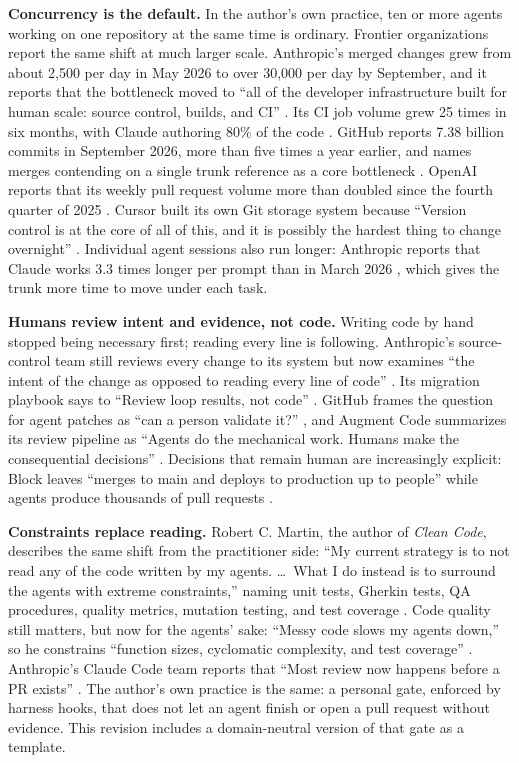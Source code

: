 \documentclass[11pt]{article}
\begin{document}
\textbf{Concurrency is the default.} In the author's own practice, ten or more agents working on one repository at the same time is ordinary. Frontier organizations report the same shift at much larger scale. Anthropic's merged changes grew from about 2,500 per day in May 2026 to over 30,000 per day by September, and it reports that the bottleneck moved to ``all of the developer infrastructure built for human scale: source control, builds, and CI'' \cite{anthropic2026scion}. Its CI job volume grew 25 times in six months, with Claude authoring 80\% of the code \cite{malhotra2026ci}. GitHub reports 7.38 billion commits in September 2026, more than five times a year earlier, and names merges contending on a single trunk reference as a core bottleneck \cite{celenza2026gitinfra}. OpenAI reports that its weekly pull request volume more than doubled since the fourth quarter of 2025 \cite{srikanth2026reviewrules}. Cursor built its own Git storage system because ``Version control is at the core of all of this, and it is possibly the hardest thing to change overnight'' \cite{marti2026gitscale}. Individual agent sessions also run longer: Anthropic reports that Claude works 3.3 times longer per prompt than in March 2026 \cite{segner2026longsessions}, which gives the trunk more time to move under each task.

\textbf{Humans review intent and evidence, not code.} Writing code by hand stopped being necessary first; reading every line is following. Anthropic's source-control team still reviews every change to its system but now examines ``the intent of the change as opposed to reading every line of code'' \cite{anthropic2026scion}. Its migration playbook says to ``Review loop results, not code'' \cite{anthropic2026migrations}. GitHub frames the question for agent patches as ``can a person validate it?'' \cite{abuadas2026yes}, and Augment Code summarizes its review pipeline as ``Agents do the mechanical work. Humans make the consequential decisions'' \cite{utture2026prmerge}. Decisions that remain human are increasingly explicit: Block leaves ``merges to main and deploys to production up to people'' while agents produce thousands of pull requests \cite{anthropic2026block}.

\textbf{Constraints replace reading.} Robert C. Martin, the author of \emph{Clean Code}, describes the same shift from the practitioner side: ``My current strategy is to not read any of the code written by my agents. \ldots\ What I do instead is to surround the agents with extreme constraints,'' naming unit tests, Gherkin tests, QA procedures, quality metrics, mutation testing, and test coverage \cite{martin2026constraints}. Code quality still matters, but now for the agents' sake: ``Messy code slows my agents down,'' so he constrains ``function sizes, cyclomatic complexity, and test coverage'' \cite{martin2026messy}. Anthropic's Claude Code team reports that ``Most review now happens before a PR exists'' \cite{osmani2026codereview}. The author's own practice is the same: a personal gate, enforced by harness hooks, that does not let an agent finish or open a pull request without evidence. This revision includes a domain-neutral version of that gate as a template.
\end{document}
